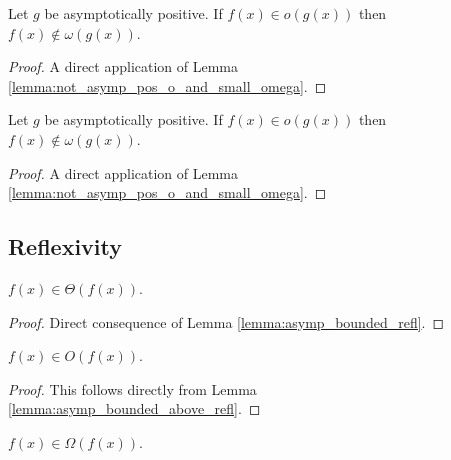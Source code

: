 \begin{lemma}
    \label{lemma:not_asymp_pos_small_omega_of_o}
    \leanok
    Let $g$ be asymptotically positive. If $f(x) \in o(g(x))$ then $f(x) \notin \omega(g(x))$.
\end{lemma}

\begin{proof}
    \leanok
    A direct application of Lemma \ref{lemma:not_asymp_pos_o_and_small_omega}.
\end{proof}

\begin{lemma}
    \label{lemma:not_asymp_pos_o_of_small_omega}
    \leanok
    Let $g$ be asymptotically positive. If $f(x) \in o(g(x))$ then $f(x) \notin \omega(g(x))$.
\end{lemma}

\begin{proof}
    \leanok
    A direct application of Lemma \ref{lemma:not_asymp_pos_o_and_small_omega}.
\end{proof}


\subsection{Reflexivity}

\begin{lemma}
    \label{lemma:theta_refl}
    \leanok
    $f(x) \in \Theta(f(x))$.

\end{lemma}

\begin{proof}
    \leanok
    Direct consequence of Lemma \ref{lemma:asymp_bounded_refl}.
\end{proof}

\begin{lemma}
    \label{lemma:O_refl}
    \leanok
    $f(x) \in O(f(x))$.
\end{lemma}

\begin{proof}
    \leanok
    This follows directly from Lemma \ref{lemma:asymp_bounded_above_refl}.
\end{proof}

\begin{lemma}
    \label{lemma:Omega_refl}
    \leanok
    $f(x) \in \Omega(f(x))$.
\end{lemma}

